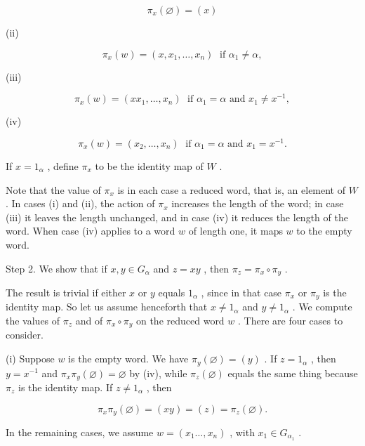 \[
{\pi }_{x}\left( \varnothing \right)  = \left( x\right)
\]

(ii)

\[
{\pi }_{x}\left( w\right)  = \left( {x,{x}_{1},\ldots ,{x}_{n}}\right) \;\text{ if }{\alpha }_{1} \neq  \alpha ,
\]

(iii)

\[
{\pi }_{x}\left( w\right)  = \left( {x{x}_{1},\ldots ,{x}_{n}}\right) \;\text{ if }{\alpha }_{1} = \alpha \text{ and }{x}_{1} \neq  {x}^{-1},
\]

(iv)

\[
{\pi }_{x}\left( w\right)  = \left( {{x}_{2},\ldots ,{x}_{n}}\right) \;\text{ if }{\alpha }_{1} = \alpha \text{ and }{x}_{1} = {x}^{-1}.
\]

If \(x = {1}_{\alpha }\) , define \({\pi }_{x}\) to be the identity map of \(W\) .

Note that the value of \({\pi }_{x}\) is in each case a reduced word, that is, an element of \(W\) . In cases (i) and (ii), the action of \({\pi }_{x}\) increases the length of the word; in case (iii) it leaves the length unchanged, and in case (iv) it reduces the length of the word. When case (iv) applies to a word \(w\) of length one, it maps \(w\) to the empty word.

Step 2. We show that if \(x,y \in  {G}_{\alpha }\) and \(z = {xy}\) , then \({\pi }_{z} = {\pi }_{x} \circ  {\pi }_{y}\) .

The result is trivial if either \(x\) or \(y\) equals \({1}_{\alpha }\) , since in that case \({\pi }_{x}\) or \({\pi }_{y}\) is the identity map. So let us assume henceforth that \(x \neq  {1}_{\alpha }\) and \(y \neq  {1}_{\alpha }\) . We compute the values of \({\pi }_{z}\) and of \({\pi }_{x} \circ  {\pi }_{y}\) on the reduced word \(w\) . There are four cases to consider.

(i) Suppose \(w\) is the empty word. We have \({\pi }_{y}\left( \varnothing \right)  = \left( y\right)\) . If \(z = {1}_{\alpha }\) , then \(y = {x}^{-1}\) and \({\pi }_{x}{\pi }_{y}\left( \varnothing \right)  = \varnothing\) by (iv), while \({\pi }_{z}\left( \varnothing \right)\) equals the same thing because \({\pi }_{z}\) is the identity map. If \(z \neq  {1}_{\alpha }\) , then

\[
{\pi }_{x}{\pi }_{y}\left( \varnothing \right)  = \left( {xy}\right)  = \left( z\right)  = {\pi }_{z}\left( \varnothing \right) .
\]

In the remaining cases, we assume \(w = \left( {{x}_{1}\ldots ,{x}_{n}}\right)\) , with \({x}_{1} \in  {G}_{{\alpha }_{1}}\) .

